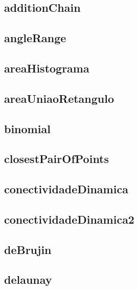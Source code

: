 \subsection{additionChain}
\raggedbottom
\hrulefill
\subsection{angleRange}
\raggedbottom
\hrulefill
\subsection{areaHistograma}
\raggedbottom
\hrulefill
\subsection{areaUniaoRetangulo}
\raggedbottom
\hrulefill
\subsection{binomial}
\raggedbottom
\hrulefill
\subsection{closestPairOfPoints}
\raggedbottom
\hrulefill
\subsection{conectividadeDinamica}
\raggedbottom
\hrulefill
\subsection{conectividadeDinamica2}
\raggedbottom
\hrulefill
\subsection{deBrujin}
\raggedbottom
\hrulefill
\subsection{delaunay}
\raggedbottom
\hrulefill
